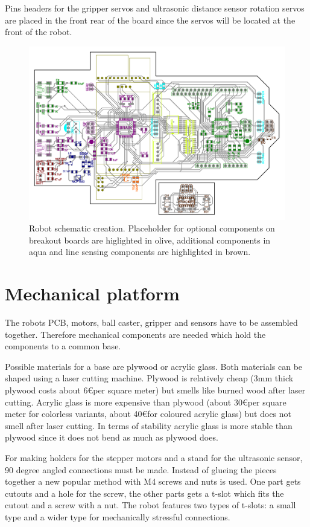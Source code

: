 Pins headers for the gripper servos and ultrasonic distance sensor rotation servos are placed in the front rear of the board since the servos will be located at the front of the robot. 

\begin{figure}[H]
  \centering
  \includegraphics[width=\textwidth]{images/schematic/robot_schematic_optional.pdf}
  \caption{Robot schematic creation. Placeholder for optional components on breakout boards are higlighted in olive, additional components in aqua and line sensing components are highlighted in brown.}
\end{figure}



\section{Mechanical platform}
The robots PCB, motors, ball caster, gripper and sensors have to be assembled together. Therefore mechanical components are needed which hold the components to a common base. 

Possible materials for a base are plywood or acrylic glass. Both materials can be shaped using a laser cutting machine.  Plywood is relatively cheap (3mm thick plywood costs about 6\euro per square meter) but smells like burned wood after laser cutting. Acrylic glass is more expensive than plywood (about 30\euro per square meter for colorless variants, about 40\euro for coloured acrylic glass) but does not smell after laser cutting. In terms of stability acrylic glass is more stable than plywood since it does not bend as much as plywood does.

For making holders for the stepper motors and a stand for the ultrasonic sensor, 90 degree angled connections must be made. Instead of glueing the pieces together a new popular method with M4 screws and nuts is used. One part gets cutouts and a hole for the screw, the other parts gets a t-slot which fits the cutout and a screw with a nut. The robot features two types of t-slots: a small type and a wider type for mechanically stressful connections.

